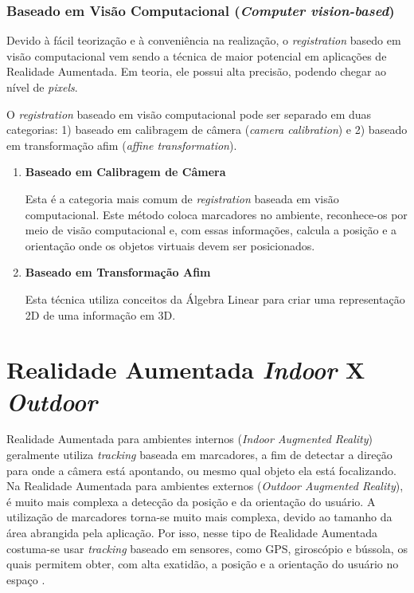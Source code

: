 \subsubsection{Baseado em Visão Computacional (\textit{Computer vision-based})}

Devido à fácil teorização e à conveniência na realização, o \textit{registration} basedo em visão computacional
vem sendo a técnica de maior potencial em aplicações de Realidade Aumentada. Em teoria, ele possui alta precisão,
podendo chegar ao nível de \textit{pixels}.

O \textit{registration} baseado em visão computacional pode ser separado em duas categorias: 1) baseado em
calibragem de câmera (\textit{camera calibration}) e 2) baseado em transformação afim
(\textit{affine transformation}).

\begin{enumerate}
    \item \textbf{Baseado em Calibragem de Câmera}
    
    Esta é a categoria mais comum de \textit{registration} baseada em visão computacional. 
    Este método coloca marcadores no ambiente, reconhece-os por meio de visão computacional e, com essas informações, 
    calcula a posição e a orientação onde os objetos virtuais devem ser posicionados. 


    \item \textbf{Baseado em Transformação Afim}
    
    Esta técnica utiliza conceitos da Álgebra Linear para criar uma representação 2D de
    uma informação em 3D.
\end{enumerate}


\section{Realidade Aumentada \textit{Indoor} X \textit{Outdoor}}

Realidade Aumentada para ambientes internos (\textit{Indoor Augmented Reality})
geralmente utiliza \textit{tracking} baseada em marcadores, a fim de detectar
a direção para onde a câmera está apontando, ou mesmo qual objeto ela está
focalizando. Na Realidade Aumentada para ambientes externos (\textit{Outdoor Augmented Reality}),
é muito mais complexa a detecção da posição e da orientação do usuário. A utilização 
de marcadores torna-se muito mais complexa, devido ao tamanho da área abrangida pela aplicação.
Por isso, nesse tipo de Realidade Aumentada costuma-se usar \textit{tracking} baseado em sensores,
como \gls{GPS}, giroscópio e bússola, os quais permitem obter, com alta exatidão, a posição e a
orientação do usuário no espaço \cite{HybridTrackingForGIS}.





